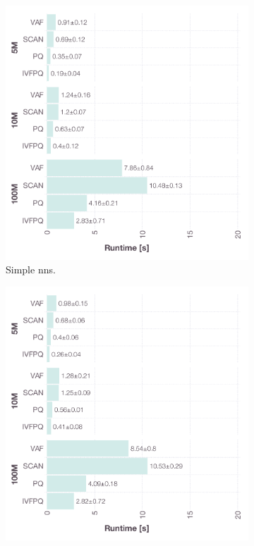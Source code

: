 \begin{figure}[p]
    \centering
    \begin{subfigure}[b]{0.49\textwidth}
        \centering
        \includegraphics[width=\textwidth]{figures/bignns/cottontail/bignns-cottontail-NNS-runtime}
        \caption{Simple \acrshort{nns}.}
        \label{figure:cottontail_nns_runtime}
    \end{subfigure}
    \hfill
    \centering
    \begin{subfigure}[b]{0.49\textwidth}
        \centering
        \includegraphics[width=\textwidth]{figures/bignns/cottontail/bignns-cottontail-NNS + Fetch-runtime}

\end{subfigure}
\end{figure}
